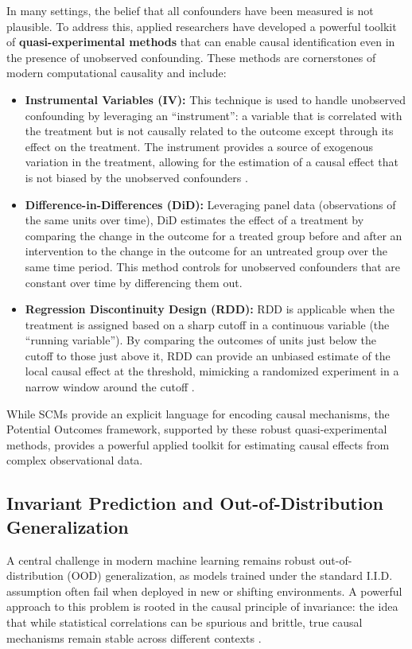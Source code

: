 {In many settings, the belief that all confounders have been measured is not plausible. To address this, applied researchers have developed a powerful toolkit of \textbf{quasi-experimental methods} that can enable causal identification even in the presence of unobserved confounding. These methods are cornerstones of modern computational causality and include:
\begin{itemize}
    \item \textbf{Instrumental Variables (IV):} This technique is used to handle unobserved confounding by leveraging an ``instrument'': a variable that is correlated with the treatment but is not causally related to the outcome except through its effect on the treatment. The instrument provides a source of exogenous variation in the treatment, allowing for the estimation of a causal effect that is not biased by the unobserved confounders \cite{angrist1996identification}.
    \item \textbf{Difference-in-Differences (DiD):} Leveraging panel data (observations of the same units over time), DiD estimates the effect of a treatment by comparing the change in the outcome for a treated group before and after an intervention to the change in the outcome for an untreated group over the same time period. This method controls for unobserved confounders that are constant over time by differencing them out\cite{callaway2021difference}.
    \item \textbf{Regression Discontinuity Design (RDD):} RDD is applicable when the treatment is assigned based on a sharp cutoff in a continuous variable (the ``running variable''). By comparing the outcomes of units just below the cutoff to those just above it, RDD can provide an unbiased estimate of the local causal effect at the threshold, mimicking a randomized experiment in a narrow window around the cutoff \cite{imbens2008regression}.
\end{itemize}

While SCMs provide an explicit language for encoding causal mechanisms, the Potential Outcomes framework, supported by these robust quasi-experimental methods, provides a powerful applied toolkit for estimating causal effects from complex observational data.

\subsection{Invariant Prediction and Out-of-Distribution Generalization}

A central challenge in modern machine learning remains robust out-of-distribution (OOD) generalization, as models trained under the standard I.I.D. assumption often fail when deployed in new or shifting environments. A powerful approach to this problem is rooted in the causal principle of invariance: the idea that while statistical correlations can be spurious and brittle, true causal mechanisms remain stable across different contexts \cite{pearl2000causality}.

}
